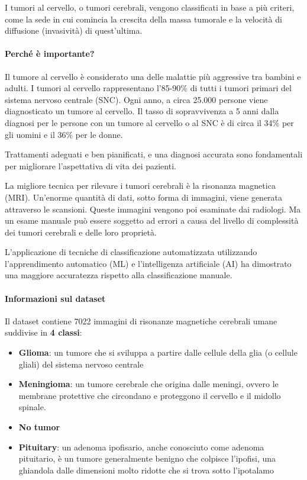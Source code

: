         I tumori al cervello, o tumori cerebrali, vengono classificati in base a più criteri, come la sede in cui comincia la crescita della massa tumorale e la velocità di diffusione (invasività) di quest'ultima.
        
        \paragraph{Perché è importante?}
        Il tumore al cervello è considerato una delle malattie più aggressive tra bambini e adulti. %
        I tumori al cervello rappresentano l'85-90$\%$ di tutti i tumori primari del sistema nervoso centrale (SNC). Ogni anno, a circa 25.000 persone viene diagnosticato un tumore al cervello. Il tasso di sopravvivenza a 5 anni dalla diagnosi per le persone con un tumore al cervello o al SNC è di circa il 34$\%$ per gli uomini e il 36$\%$ per le donne.
        
        Trattamenti adeguati e ben pianificati, e una diagnosi accurata sono fondamentali per migliorare l'aspettativa di vita dei pazienti.
        
        La migliore tecnica per rilevare i tumori cerebrali è la risonanza magnetica (MRI). Un'enorme quantità di dati, sotto forma di immagini, viene generata attraverso le scansioni. Queste immagini vengono poi esaminate dai radiologi. Ma un esame manuale può essere soggetto ad errori a causa del livello di complessità dei tumori cerebrali e delle loro proprietà.
        
        L'applicazione di tecniche di classificazione automatizzata utilizzando l'apprendimento automatico (ML) e l'intelligenza artificiale (AI) ha dimostrato una maggiore accuratezza rispetto alla classificazione manuale.
        
        \paragraph{Informazioni sul dataset}
        Il dataset \cite{Brain_Tumor_MRI_Dataset} contiene 7022 immagini di risonanze magnetiche cerebrali umane suddivise in \textbf{4 classi}:
            \begin{itemize}
                \item \textbf{Glioma}: un tumore che si sviluppa a partire dalle cellule della glia (o cellule gliali) del sistema nervoso centrale
                \item \textbf{Meningioma}: un tumore cerebrale che origina dalle meningi, ovvero le membrane protettive che circondano e proteggono il cervello e il midollo spinale.
                \item \textbf{No tumor}
                \item \textbf{Pituitary}: un adenoma ipofisario, anche conosciuto come adenoma pituitario, è un tumore generalmente benigno che colpisce l’ipofisi, una ghiandola dalle dimensioni molto ridotte che si trova sotto l’ipotalamo
            \end{itemize}
        
